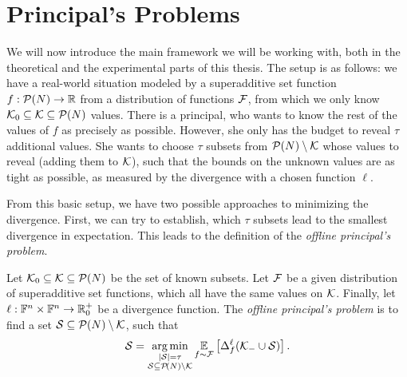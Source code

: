 \section{Principal's Problems}

We will now introduce the main framework we will be working with, both in the theoretical and the experimental parts of this thesis.
The setup is as follows: we have a real-world situation modeled by a superadditive set function $ f: \mathcal{P}\!\left(N\right) \to \mathbb{R} $ from a distribution of functions $ \mathcal{F} $, from which we only know $ \mathcal{K}_0 \subseteq \mathcal{K} \subseteq \mathcal{P}\!\left(N\right) $ values.
There is a principal, who wants to know the rest of the values of $ f $ as precisely as possible.
However, she only has the budget to reveal $ \tau $ additional values.
She wants to choose $ \tau $ subsets from $ \mathcal{P}\!\left(N\right) \setminus \mathcal{K} $ whose values to reveal (adding them to $ \mathcal{K} $), such that the bounds on the unknown values are as tight as possible, as measured by the divergence with a chosen function $ \ell $.

From this basic setup, we have two possible approaches to minimizing the divergence.
First, we can try to establish, which $ \tau $ subsets lead to the smallest divergence in expectation.
This leads to the definition of the \emph{offline principal's problem}.

\begin{defi} \label{def:offline-pp}
  Let $ \mathcal{K}_0 \subseteq \mathcal{K} \subseteq \mathcal{P}\!\left(N\right) $ be the set of known subsets.
  Let $ \mathcal{F} $ be a given distribution of superadditive set functions, which all have the same values on $ \mathcal{K} $.
  Finally, let $ \ell: \mathbb{F}^n \times \mathbb{F}^n \to \mathbb{R}^+_0 $ be a divergence function.
  The \emph{offline principal's problem} is to find a set $ \mathcal{S} \subseteq \mathcal{P}\!\left(N\right) \setminus \mathcal{K} $, such that \[
    \mathcal{S} = \operatorname*{arg\,min}_{\substack{\left|{\mathcal{S}}\right| = \tau \\ \mathcal{S} \subseteq \mathcal{P}\!\left(N\right) \setminus \mathcal{K} }} \operatorname*{\mathbb{E}}_{f \sim \mathcal{F}} \left[ \Delta_{f}^{\ell}\!\left(\mathcal{K}_- \cup \mathcal{S}\right) \right].
  \]
\end{defi}

